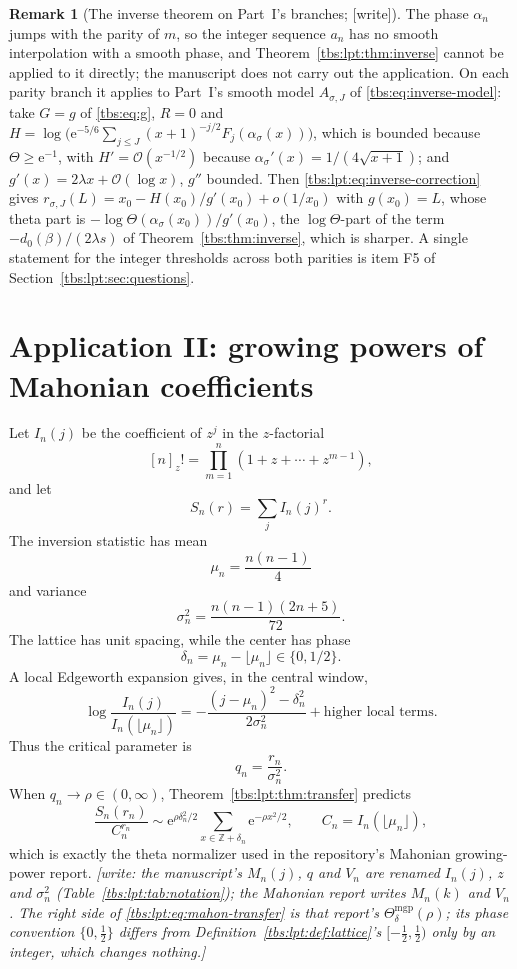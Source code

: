 \documentclass[11pt,a4paper]{article}
\numberwithin{equation}{section}
\theoremstyle{definition}
\newtheorem{remark}[theorem]{Remark}
\newcommand{\Z}{\mathbb Z}
\newcommand{\ee}{\mathrm e}
\newcommand{\OO}{\mathcal O}
\begin{document}
\begin{remark}[The inverse theorem on Part~I's branches; {[write]}]\label{tbs:lpt:rem:ballot-inverse}
The phase $\alpha_n$ jumps with the parity of $m$, so the integer
sequence $a_n$ has no smooth interpolation with a smooth phase, and
Theorem~\ref{tbs:lpt:thm:inverse} cannot be applied to it directly; the
manuscript does not carry out the application. On each parity branch it
applies to Part~I's smooth model $A_{\sigma,J}$ of
\eqref{tbs:eq:inverse-model}: take $G=g$ of \eqref{tbs:eq:g}, $R=0$ and
$H=\log\bigl(\ee^{-5/6}\sum_{j\le J}(x+1)^{-j/2}F_j(\alpha_\sigma(x))\bigr)$,
which is bounded because $\Theta\ge\ee^{-1}$, with $H'=\OO(x^{-1/2})$
because $\alpha_\sigma'(x)=1/(4\sqrt{x+1})$; and $g'(x)=2\lambda x+\OO(\log
x)$, $g''$ bounded. Then \eqref{tbs:lpt:eq:inverse-correction} gives
$r_{\sigma,J}(L)=x_0-H(x_0)/g'(x_0)+o(1/x_0)$ with $g(x_0)=L$, whose theta
part is $-\log\Theta(\alpha_\sigma(x_0))/g'(x_0)$, the
$\log\Theta$-part of the term $-d_0(\beta)/(2\lambda s)$ of
Theorem~\ref{tbs:thm:inverse}, which is sharper. A single statement for
the integer thresholds across both parities is item F5 of
Section~\ref{tbs:lpt:sec:questions}.
\end{remark}

\section{Application II: growing powers of Mahonian coefficients}\label{tbs:lpt:sec:mahonian}

Let $I_n(j)$ be the coefficient of $z^j$ in the $z$-factorial
\[
 [n]_z!=\prod_{m=1}^n(1+z+\cdots+z^{m-1}),
\]
and let
\[
 S_n(r)=\sum_j I_n(j)^r.
\]
The inversion statistic has mean
\[
 \mu_n=\frac{n(n-1)}4
\]
and variance
\[
 \sigma_n^2=\frac{n(n-1)(2n+5)}{72}.
\]
The lattice has unit spacing, while the center has phase
\[
 \delta_n=\mu_n-\lfloor\mu_n\rfloor\in\{0,1/2\}.
\]
A local Edgeworth expansion gives, in the central window,
\begin{equation}\label{tbs:lpt:eq:mahon-local}
 \log\frac{I_n(j)}{I_n(\lfloor\mu_n\rfloor)}
 =-\frac{(j-\mu_n)^2-\delta_n^2}{2\sigma_n^2}
 +\text{higher local terms}.
\end{equation}
Thus the critical parameter is
\[
 q_n=\frac{r_n}{\sigma_n^2}.
\]
When $q_n\to\rho\in(0,\infty)$, Theorem~\ref{tbs:lpt:thm:transfer}
predicts
\begin{equation}\label{tbs:lpt:eq:mahon-transfer}
 \frac{S_n(r_n)}{C_n^{r_n}}
 \sim \ee^{\rho\delta_n^2/2}
 \sum_{x\in\Z+\delta_n}\ee^{-\rho x^2/2},
 \qquad C_n=I_n(\lfloor\mu_n\rfloor),
\end{equation}
which is exactly the theta normalizer used in the repository's Mahonian
growing-power report.
\emph{[write: the manuscript's $M_n(j)$, $q$ and $V_n$ are renamed $I_n(j)$,
$z$ and $\sigma_n^2$ (Table~\ref{tbs:lpt:tab:notation}); the Mahonian
report writes $M_n(k)$ and $V_n$. The right side of
\eqref{tbs:lpt:eq:mahon-transfer} is that report's
$\Theta^{\mathrm{mgp}}_\delta(\rho)$; its phase convention $\{0,\frac12\}$
differs from Definition~\ref{tbs:lpt:def:lattice}'s $[-\frac12,\frac12)$
only by an integer, which changes nothing.]}
\end{document}

